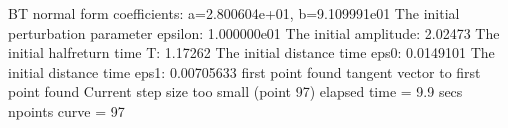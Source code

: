 \documentclass[letterpaper,10pt,english]{jupyterBook}
\begin{document}
\begin{sphinxVerbatim}[commandchars=\\\{\}]
\PYG{p}{[}\PYG{p}{]}
\end{sphinxVerbatim}

\begin{sphinxVerbatim}[commandchars=\\\{\}]
BT normal form coefficients:
a=\PYGZhy{}2.800604e+01,	 b=9.109991e\PYGZhy{}01
The initial perturbation parameter epsilon:  1.000000e\PYGZhy{}01
The initial amplitude: 2.02473
The initial half\PYGZhy{}return time T: 1.17262
The initial distance time eps0: 0.0149101
The initial distance time eps1: 0.00705633
first point found
tangent vector to first point found
Current step size too small (point 97)
elapsed time  = 9.9 secs
npoints curve = 97
\end{sphinxVerbatim}
\end{document}
